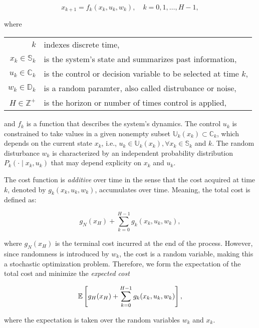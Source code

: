 \begin{equation*}
  x_{k+1} = f_k(x_k, u_k, w_k), \quad k = 0,1,\dots,H-1,
\end{equation*}

where

\begin{table}[h]
  \centering
  \begin{tabular}{rl}
    $k$ & indexes discrete time, \\
    $x_k \in \mathbb{S}_k$  & is the system's state and summarizes past information, \\
    $u_k \in \mathbb{C}_k$ & is the control or decision variable to be selected at time $k$, \\
    $w_k \in \mathbb{D}_k$ & is a random paramter, also called distrubance or noise, \\
    $H \in \mathbb{Z}^+$ & is the horizon or number of times control is applied, 
  \end{tabular}
\end{table}

and $f_k$ is a function that describes the system's dynamics. The control $u_k$
is constrained to take values in a given nonempty subset $\mathbb{U}_k(x_k)
\subset \mathbb{C}_k$, which depends on the current state $x_k$, i.e., $u_k \in
\mathbb{U}_k(x_k), \forall x_k \in \mathbb{S}_k$ and $k$. The random disturbance
$w_k$ is characterized by an independent probability distribution $P_k(\cdot\mid
x_k,u_k)$ that may depend explicity on $x_k$ and $u_k$.

The cost function is \textit{additive} over time in the sense that the cost
acquired at time $k$, denoted by $g_k(x_k, u_k, w_k)$, accumulates over time.
Meaning, the total cost is defined as:

\begin{equation*}
  g_N(x_H) + \sum\limits_{k=0}^{H-1}{g_k(x_k, u_k, w_k)},
\end{equation*}

where $g_N(x_H)$ is the terminal cost incurred at the end of the process.
However, since randomness is introduced by $w_k$, the cost is a random variable,
making this a stochastic optimization problem. Therefore, we form the
expectation of the total cost and minimize the \textit{expected cost}

\begin{equation*}
  \mathbb{E}\left[g_H(x_H) + \sum\limits_{k=0}^{H-1}{g_k(x_k, u_k, w_k)}\right],
\end{equation*}

where the expectation is taken over the random variables $w_k$ and $x_k$.

